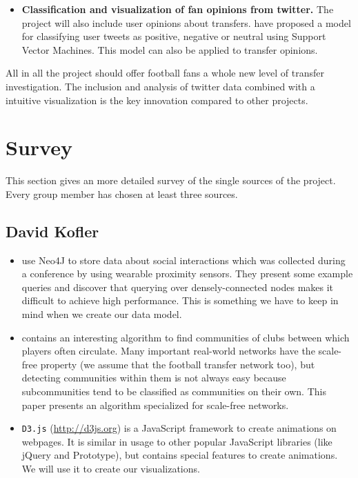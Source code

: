 \documentclass{article}
\begin{document}
\begin{itemize}
	\item \textbf{Classification and visualization of fan opinions from twitter.} The project will also include user opinions about transfers. \cite{Shrivatava2014} have proposed a model for classifying user tweets as positive, negative or neutral using Support Vector Machines. This model can also be applied to transfer opinions.
\end{itemize}

All in all the project should offer football fans a whole new level of transfer investigation. The inclusion and analysis of twitter data combined with a intuitive visualization is the key innovation compared to other projects.

\section{Survey}
This section gives an more detailed survey of the single sources of the project. Every group member has chosen at least three sources.
\subsection{David Kofler}

\begin{itemize}
	\item \cite{Cattuto:2013:TSN:2484425.2484442} use Neo4J to store data about social interactions which was collected during a conference by using wearable proximity sensors. They present some example queries and discover that querying over densely-connected nodes makes it difficult to achieve high performance. This is something we have to keep in mind when we create our data model.

	\item \cite{Jarukasemratana:2013:CDA:2481492.2481527} contains an interesting algorithm to find communities of clubs between which players often circulate. Many important real-world networks have the scale-free property (we assume that the football transfer network too), but detecting communities within them is not always easy because subcommunities tend to be classified as communities on their own. This paper presents an algorithm specialized for scale-free networks.

	\item \verb+D3.js+ (\url{http://d3js.org}) is a JavaScript framework to create animations on webpages. It is similar in usage to other popular JavaScript libraries (like jQuery and Prototype), but contains special features to create animations. We will use it to create our visualizations.
\end{itemize}
\end{document}
